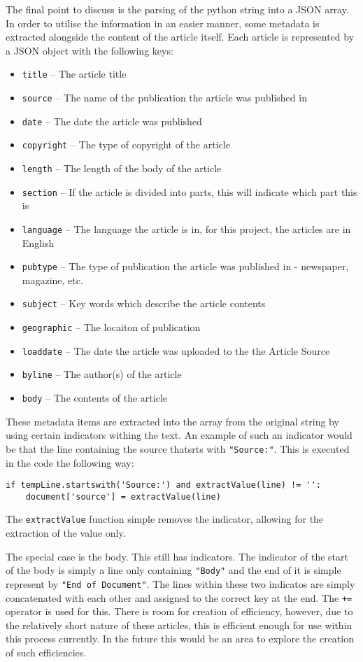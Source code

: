 The final point to discuss is the parsing of the python string into a JSON array. In order to utilise the information in an easier manner, some metadata is extracted alongside the content of the article itself. Each article is represented by a JSON object with the following keys:
\begin{itemize}
    \item \texttt{title} -- The article title
    \item \texttt{source} -- The name of the publication the article was published in
    \item \texttt{date} -- The date the article was published
    \item \texttt{copyright} -- The type of copyright of the article
    \item \texttt{length} -- The length of the body of the article
    \item \texttt{section} -- If the article is divided into parts, this will indicate which part this is
    \item \texttt{language} -- The language the article is in, for this project, the articles are in English
    \item \texttt{pubtype} -- The type of publication the article was published in - newspaper, magazine, etc.
    \item \texttt{subject} -- Key words which describe the article contents
    \item \texttt{geographic} -- The locaiton of publication
    \item \texttt{loaddate} -- The date the article was uploaded to the the Article Source
    \item \texttt{byline} -- The author(s) of the article
    \item \texttt{body} -- The contents of the article
\end{itemize}
These metadata items are extracted into the array from the original string by using certain indicators withing the text. An example of such an indicator would be that the line containing the source thatsrts with \verb|"Source:"|. This is executed in the code the following way:
\begin{lstlisting}[caption=Source Extraction]
if tempLine.startswith('Source:') and extractValue(line) != '':
    document['source'] = extractValue(line)
\end{lstlisting}
The \verb|extractValue| function simple removes the indicator, allowing for the extraction of the value only.

The special case is the body. This still has indicators. The indicator of the start of the body is simply a line only containing \verb|"Body"| and the end of it is simple represent by \verb|"End of Document"|. The lines within these two indicatos are simply concatenated with each other and assigned to the correct key at the end. The \verb|+=| operator is used for this. There is room for creation of efficiency, however, due to the relatively short nature of these articles, this is efficient enough for use within this process currently. In the future this would be an area to explore the creation of such efficiencies.

